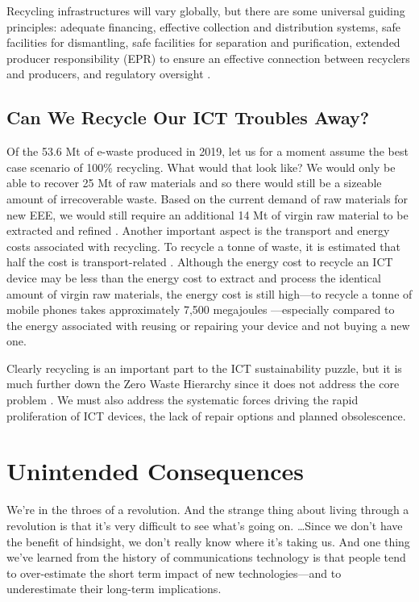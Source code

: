 \documentclass{article}
\begin{document}
Recycling infrastructures will vary globally, but there are some universal guiding principles: adequate financing, effective collection and distribution systems, safe facilities for dismantling, safe facilities for separation and purification, extended producer responsibility (EPR) to ensure an effective connection between recyclers and producers, and regulatory oversight \cite{braungart2007cradle, bournay2006vital, forti2020global}.

\subsection{Can We Recycle Our ICT Troubles Away?}
Of the 53.6 Mt of e-waste produced in 2019, let us for a moment assume the best case scenario of 100\% recycling. What would that look like? We would only be able to recover 25 Mt of raw materials and so there would still be a sizeable amount of irrecoverable waste. Based on the current demand of raw materials for new EEE, we would still require an additional 14 Mt of virgin raw material to be extracted and refined \cite{forti2020global}. Another important aspect is the transport and energy costs associated with recycling. To recycle a tonne of waste, it is estimated that half the cost is transport-related \cite{bournay2006vital}. Although the energy cost to recycle an ICT device may be less than the energy cost to extract and process the identical amount of virgin raw materials, the energy cost is still high---to recycle a tonne of mobile phones takes approximately 7,500 megajoules \cite{navazo2014material}---especially compared to the energy associated with reusing or repairing your device and not buying a new one.

Clearly recycling is an important part to the ICT sustainability puzzle, but it is much further down the Zero Waste Hierarchy since it does not address the core problem \cite{zerowastecanada2017hierarchy}. We must also address the systematic forces driving the rapid proliferation of ICT devices, the lack of repair options and planned obsolescence.


\cleardoublepage
\section{Unintended Consequences} \label{UNINTENDED_CONSEQUENCES}
\begin{fquote} 
We're in the throes of a revolution. And the strange thing about living through a revolution is that it’s very difficult to see what’s going on. \ldots Since we don’t have the benefit of hindsight, we don’t really know where it's taking us. And one thing we've learned from the history of communications technology is that people tend to over-estimate the short term impact of new technologies—and to underestimate their long-term implications.
\end{fquote}
\end{document}

